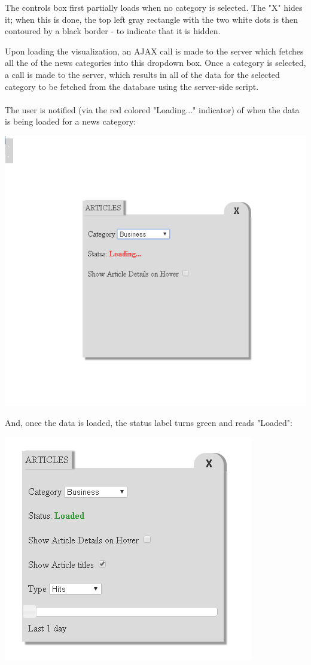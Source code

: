 \documentclass[12pt]{article}
\begin{document}
\noindent The controls box first partially loads when no category is selected. The "X" hides it; when this is done, the top left gray rectangle with the two white dots is then contoured by a black border - to indicate that it is hidden.

Upon loading the visualization, an AJAX call is made to the server which fetches all the of the news categories into this dropdown box. Once a category is selected, a call is made to the server, which results in all of the data for the selected category to be fetched from the database using the server-side script.\\ \\ The user is notified (via the red colored "Loading..." indicator) of when the data is being loaded for a news category:

\noindent\includegraphics[scale=0.6]{img/viz_4}

And, once the data is loaded, the status label turns green and reads "Loaded":

\noindent\includegraphics[scale=0.6]{img/viz_5}
\end{document}
